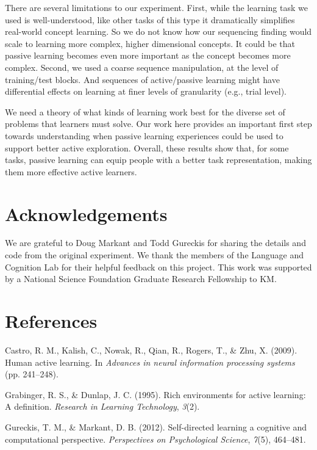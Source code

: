 \documentclass[10pt, letterpaper]{article}
\begin{document}
There are several limitations to our experiment. First, while the
learning task we used is well-understood, like other tasks of this type
it dramatically simplifies real-world concept learning. So we do not
know how our sequencing finding would scale to learning more complex,
higher dimensional concepts. It could be that passive learning becomes
even more important as the concept becomes more complex. Second, we used
a coarse sequence manipulation, at the level of training/test blocks.
And sequences of active/passive learning might have differential effects
on learning at finer levels of granularity (e.g., trial level).

We need a theory of what kinds of learning work best for the diverse set
of problems that learners must solve. Our work here provides an
important first step towards understanding when passive learning
experiences could be used to support better active exploration. Overall,
these results show that, for some tasks, passive learning can equip
people with a better task representation, making them more effective
active learners.

\section{Acknowledgements}\label{acknowledgements}

We are grateful to Doug Markant and Todd Gureckis for sharing the
details and code from the original experiment. We thank the members of
the Language and Cognition Lab for their helpful feedback on this
project. This work was supported by a National Science Foundation
Graduate Research Fellowship to KM.

\section{References}\label{references}

\setlength{\parindent}{-0.1in} \setlength{\leftskip}{0.125in} \noindent

Castro, R. M., Kalish, C., Nowak, R., Qian, R., Rogers, T., \& Zhu, X.
(2009). Human active learning. In \emph{Advances in neural information
processing systems} (pp. 241--248).

Grabinger, R. S., \& Dunlap, J. C. (1995). Rich environments for active
learning: A definition. \emph{Research in Learning Technology},
\emph{3}(2).

Gureckis, T. M., \& Markant, D. B. (2012). Self-directed learning a
cognitive and computational perspective. \emph{Perspectives on
Psychological Science}, \emph{7}(5), 464--481.
\end{document}
